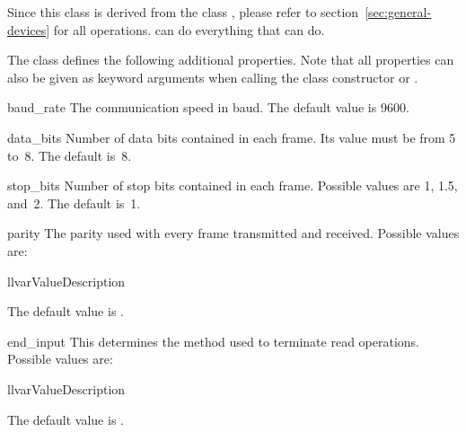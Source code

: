 \documentclass{howto}
\begin{document}
\begin{notice}
  Since this class is derived from the class , please refer
  to section~\ref{sec:general-devices} for all operations.
   can do everything that  can do.
\end{notice}

The class  defines the following additional properties.
Note that all properties can also be given as keyword arguments when calling
the class constructor or .

\begin{memberdesc}{baud_rate}
  The communication speed in baud.  The default value is 9600.
\end{memberdesc}

\begin{memberdesc}{data_bits}
  Number of data bits contained in each frame.  Its value must be from 5 to~8.
  The default is~8.
\end{memberdesc}

\begin{memberdesc}{stop_bits}
  Number of stop bits contained in each frame.  Possible values are 1, 1.5,
  and~2.  The default is~1.
\end{memberdesc}

\begin{memberdesc}{parity}
  The parity used with every frame transmitted and received.  Possible values
  are:

  \begin{tableii}{ll}{var}{Value}{Description}
  \end{tableii}

  The default value is .
\end{memberdesc}

\begin{memberdesc}{end_input}
  This determines the method used to terminate read operations.  Possible
  values are:

  \begin{tableii}{ll}{var}{Value}{Description}
  \end{tableii}

  The default value is .
\end{memberdesc}
\end{document}
